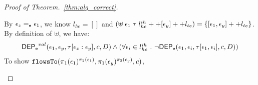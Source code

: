 \begin{proof}[Proof of Theorem.~\ref{thm:alg_correct}]
\begin{case}
\begin{subcase}
\begin{subsubcase}[$\event_z \eventeq \event_1$]
By $\event_z \eventeq \event_1$, we know $l_{he} = []$ and 
$(\uplus \; \mathtt{\epsilon}_1 \; \mathtt{\tau} \;  l^{ih}_{he} ++ [\mathtt{\epsilon}_y] ++ l_{te}) 
= \{[\mathtt{\epsilon}_1, \mathtt{\epsilon}_y] ++ l_{te}\}$.
%
%
\\
By definition of $\uplus$, we have:
\[
\begin{array}{l}
  \mathsf{DEP_{\mathtt{e}}}^{val}(\mathtt{\epsilon}_1, \mathtt{\epsilon}_y, \mathtt{\tau}[\mathtt{\epsilon}_z:\mathtt{\epsilon}_y], c, D)
  \land (\forall \mathtt{\epsilon}_i \in l^{ih}_{he} ~.~ \neg \mathsf{DEP_{\mathtt{e}}}(\mathtt{\epsilon}_1, \mathtt{\epsilon}_i, \mathtt{\tau}[\mathtt{\epsilon}_1, \mathtt{\epsilon}_i], c, D))
  \end{array}
\]
%
%
To show $\mathtt{flowsTo}(\pi_1(\mathtt{\epsilon}_1)^{\pi_2(\mathtt{\epsilon}_1)}, \pi_1(\mathtt{\epsilon}_y)^{\pi_2(\mathtt{\epsilon}_y)}, c)$, 

\end{subsubcase}
\end{subcase}
\end{case}
\end{proof}

